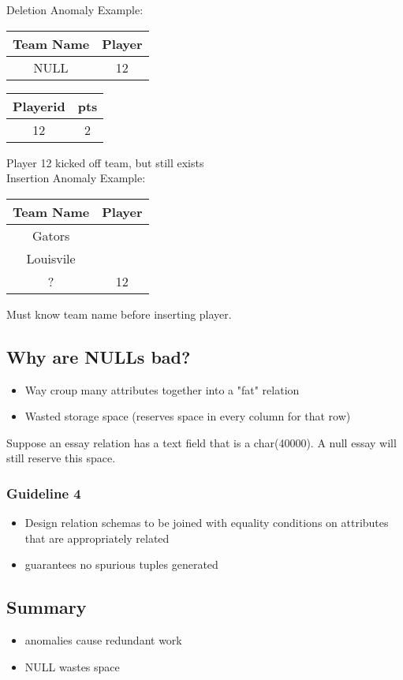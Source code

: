 \documentclass[12pt]{article}
\begin{document}
Deletion Anomaly Example:\\
\begin{tabular}{|c|c|}
\hline
Team Name & Player\\
\hline
NULL & 12\\
\hline
\end{tabular}
\begin{tabular}{|c|c|}
\hline
Playerid & pts\\
\hline
12 & 2\\
\hline
\end{tabular}
Player 12 kicked off team, but still exists\\

Insertion Anomaly Example:\\
\begin{tabular}{|c|c|}
\hline
Team Name & Player\\
\hline
Gators & \\
\hline
Louisvile & \\
\hline
? & 12\\
\hline
\end{tabular}
Must know team name before inserting player.

\subsection{Why are NULLs bad?}
\begin{itemize}
  \item {Way croup many attributes together into a "fat" relation}
  \item {Wasted storage space (reserves space in every column for that row)}
\end{itemize}

Suppose an essay relation has a text field that is a char(40000). A null essay
will still reserve this space.

\subsubsection{Guideline 4}
\begin{itemize}
  \item {Design relation schemas to be joined with equality conditions on
      attributes that are appropriately related}
  \item {guarantees no spurious tuples generated}
\end{itemize}

\subsection{Summary}
\begin{itemize}
  \item {anomalies cause redundant work}
  \item {NULL wastes space}
\end{itemize}
\end{document}
